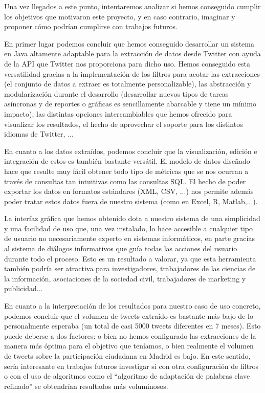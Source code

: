 Una vez llegados a este punto, intentaremos analizar si hemos conseguido cumplir los objetivos que motivaron este proyecto, y en caso contrario, imaginar y proponer cómo podrían cumplirse con trabajos futuros.

En primer lugar podemos concluir que hemos conseguido desarrollar un sistema en Java altamente adaptable para la extracción de datos desde Twitter con ayuda de la API que Twitter nos proporciona para dicho uso. Hemos conseguido esta versatilidad gracias a la implementación de los filtros para acotar las extracciones (el conjunto de datos a extraer es totalmente personalizable), las abstracción y modularización durante el desarrollo (desarrollar nuevos tipos de tareas asíncronas y de reportes o gráficas es sencillamente abarcable y tiene un mínimo impacto), las distintas opciones intercambiables que hemos ofrecido para visualizar los resultados, el hecho de aprovechar el soporte para los distintos idiomas de Twitter, ...

En cuanto a los datos extraídos, podemos concluir que la visualización, edición e integración de estos es también bastante versátil. El modelo de datos diseñado hace que resulte muy fácil obtener todo tipo de métricas que se nos ocurran a través de consultas tan intuitivas como las consultas SQL. El hecho de poder exportar los datos en formatos estándares (XML, CSV, ...) nos permite además poder tratar estos datos fuera de nuestro sistema (como en Excel, R, Matlab,...).

La interfaz gráfica que hemos obtenido dota a nuestro sistema de una simplicidad y una facilidad de uso que, una vez instalado, lo hace accesible a cualquier tipo de usuario no necesariamente experto en sistemas informáticos, en parte gracias al sistema de diálogos informativos que guía todas las acciones del usuario durante todo el proceso. Esto es un resultado a valorar, ya que esta herramienta también podría ser atractiva para investigadores, trabajadores de las ciencias de la información, asociaciones de la sociedad civil, trabajadores de marketing y publicidad...

En cuanto a la interpretación de los resultados para nuestro caso de uso concreto, podemos concluir que el volumen de tweets extraído es bastante más bajo de lo personalmente esperaba (un total de casi 5000 tweets diferentes en 7 meses). Esto puede deberse a dos factores: o bien no hemos configurado las extracciones de la manera más óptima para el objetivo que teníamos, o bien realmente el volumen de tweets sobre la participación ciudadana en Madrid es bajo. En este sentido, sería interesante en trabajos futuros investigar si con otra configuración de filtros o con el uso de algoritmos como el ``algoritmo de adaptación de palabras clave refinado''\cite{Criado2013} se obtendrían resultados más voluminosos.


